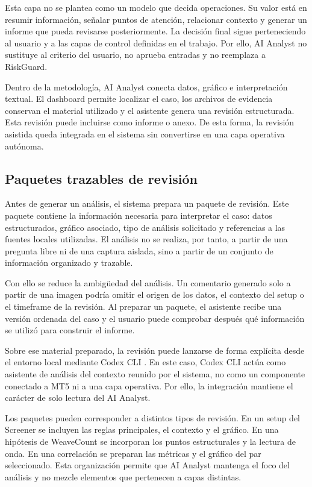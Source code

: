 Esta capa no se plantea como un modelo que decida operaciones. Su valor est\'a en
resumir informaci\'on, se\~nalar puntos de atenci\'on, relacionar contexto y generar
un informe que pueda revisarse posteriormente. La decisi\'on final sigue
perteneciendo al usuario y a las capas de control definidas en el trabajo. Por
ello, AI Analyst no sustituye al criterio del usuario, no aprueba entradas y no
reemplaza a RiskGuard.

Dentro de la metodolog\'ia, AI Analyst conecta datos, gr\'afico e interpretaci\'on
textual. El dashboard permite localizar el caso, los archivos de evidencia
conservan el material utilizado y el asistente genera una revisi\'on estructurada.
Esta revisi\'on puede incluirse como informe o anexo. De esta forma, la revisi\'on asistida queda integrada en el
sistema sin convertirse en una capa operativa aut\'onoma.

\subsection{Paquetes trazables de revisi\'on}
\label{subsec:ai-analyst-paquetes-reproducibles}

Antes de generar un an\'alisis, el sistema prepara un paquete de revisi\'on. Este
paquete contiene la informaci\'on necesaria para interpretar el caso: datos
estructurados, gr\'afico asociado, tipo de an\'alisis solicitado y referencias a
las fuentes locales utilizadas. El an\'alisis no se realiza, por tanto, a partir
de una pregunta libre ni de una captura aislada, sino a partir de un conjunto de
informaci\'on organizado y trazable.

Con ello se reduce la ambig\"uedad del an\'alisis. Un comentario generado solo a
partir de una imagen podr\'ia omitir el origen de los datos, el contexto del
setup o el timeframe de la revisi\'on. Al preparar un paquete, el asistente
recibe una versi\'on ordenada del caso y el usuario puede comprobar despu\'es qu\'e
informaci\'on se utiliz\'o para construir el informe.

Sobre ese material preparado, la revisi\'on puede lanzarse de forma expl\'icita
desde el entorno local mediante Codex CLI \cite{openai_codex_cli_docs}. En este caso, Codex CLI act\'ua como
asistente de an\'alisis del contexto reunido por el sistema, no como un componente
conectado a MT5 ni a una capa operativa. Por ello, la integraci\'on mantiene el
car\'acter de solo lectura del AI Analyst.

Los paquetes pueden corresponder a distintos tipos de revisi\'on. En un setup del
Screener se incluyen las reglas principales, el contexto y el gr\'afico. En una
hip\'otesis de WeaveCount se incorporan los puntos estructurales y la lectura de
onda. En una correlaci\'on se preparan las m\'etricas y el gr\'afico del par
seleccionado. Esta organizaci\'on permite que AI Analyst mantenga el foco del
an\'alisis y no mezcle elementos que pertenecen a capas distintas.

